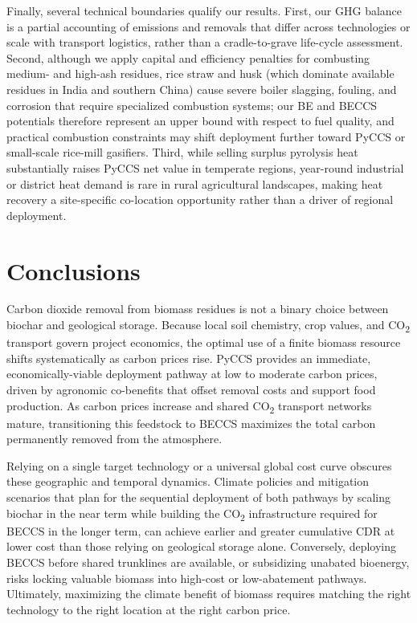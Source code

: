 \documentclass[
  letterpaper,
  twoside,
  twocolumn,
  9pt]{article}
\begin{document}
Finally, several technical boundaries qualify our results. First, our
GHG balance is a partial accounting of emissions and removals that
differ across technologies or scale with transport logistics, rather
than a cradle-to-grave life-cycle assessment. Second, although we apply
capital and efficiency penalties for combusting medium- and high-ash
residues, rice straw and husk (which dominate available residues in
India and southern China) cause severe boiler slagging, fouling, and
corrosion that require specialized combustion systems; our BE and BECCS
potentials therefore represent an upper bound with respect to fuel
quality, and practical combustion constraints may shift deployment
further toward PyCCS or small-scale rice-mill
gasifiers.\citep{field2016} Third, while selling surplus pyrolysis heat
substantially raises PyCCS net value in temperate regions, year-round
industrial or district heat demand is rare in rural agricultural
landscapes, making heat recovery a site-specific co-location opportunity
rather than a driver of regional deployment.

\section{Conclusions}\label{conclusions}

Carbon dioxide removal from biomass residues is not a binary choice
between biochar and geological storage. Because local soil chemistry,
crop values, and CO\textsubscript{2} transport govern project economics,
the optimal use of a finite biomass resource shifts systematically as
carbon prices rise. PyCCS provides an immediate, economically-viable
deployment pathway at low to moderate carbon prices, driven by agronomic
co-benefits that offset removal costs and support food production. As
carbon prices increase and shared CO\textsubscript{2} transport networks
mature, transitioning this feedstock to BECCS maximizes the total carbon
permanently removed from the atmosphere.

Relying on a single target technology or a universal global cost curve
obscures these geographic and temporal dynamics. Climate policies and
mitigation scenarios that plan for the sequential deployment of both
pathways by scaling biochar in the near term while building the
CO\textsubscript{2} infrastructure required for BECCS in the longer
term, can achieve earlier and greater cumulative CDR at lower cost than
those relying on geological storage alone. Conversely, deploying BECCS
before shared trunklines are available, or subsidizing unabated
bioenergy, risks locking valuable biomass into high-cost or
low-abatement pathways. Ultimately, maximizing the climate benefit of
biomass requires matching the right technology to the right location at
the right carbon price.
\end{document}

